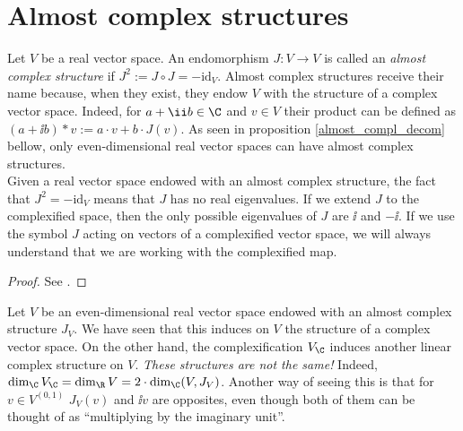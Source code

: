 \section{Almost complex structures} \label{appendix_almost_complex_structure}
Let \(V\) be a real vector space. An endomorphism \(J\colon V \to V\) is called an \textit{almost complex structure} if \(J^2:= J \circ J=-\mathrm{id}_V\). Almost complex structures receive their name because, when they exist, they endow \(V\) with the structure of a complex vector space. Indeed, for \(a+\ii b \in \C\) and \(v \in V\) their product can be defined as \((a+ \ii b)*v:=a \cdot  v+ b\cdot  J(v)\). As seen in proposition \ref{almost_compl_decom} bellow, only even-dimensional real vector spaces can have almost complex structures. \\

Given a real vector space endowed with an almost complex structure, the fact that \(J^2=-\mathrm{id}_V\) means that \(J\) has no real eigenvalues. If we extend \(J\) to the complexified space, then the only possible eigenvalues of \(J\) are \(\ii\) and \(-\ii\). If we use the symbol \(J\) acting on vectors of a complexified vector space, we will always understand that we are working with the complexified map.

\begin{proof}
    See \parencite[Prop. 1.52]{lee_introCM}. 
\end{proof}

\begin{obs}
    Let \(V\) be an even-dimensional real vector space endowed with an almost complex structure \(J_V\). We have seen that this induces on \(V\) the structure of a complex vector space. On the other hand, the complexification \(V_\C\) induces another linear complex structure on \(V\). \textit{These structures are not the same!} Indeed, \(\dim_\C V_\C=\dim_\R V=2\cdot \dim_\C(V,J_V)\). Another way of seeing this is that for \(v\in V^{(0,1)}\) \(J_V(v)\) and \(\ii v\) are opposites, even though both of them can be thought of as ``multiplying by the imaginary unit''.
\end{obs}

